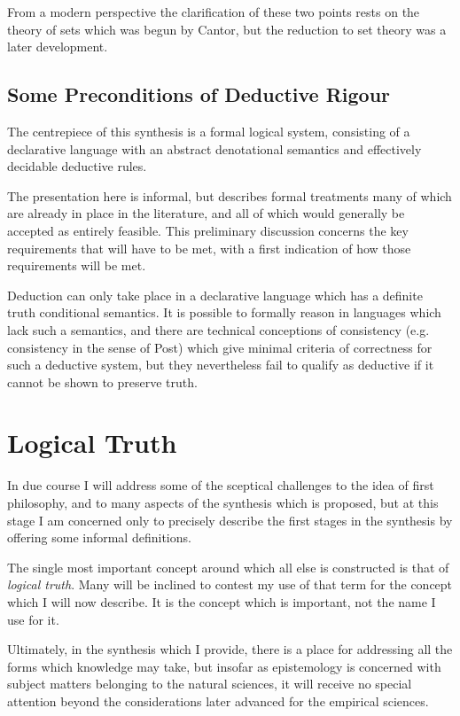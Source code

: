 \documentclass[10pt,titlepage]{book}
\begin{document}
From a modern perspective the clarification of these two points rests on the theory of sets which was begun by Cantor, but the reduction to set theory was a later development.

\section{Some Preconditions of Deductive Rigour}

The centrepiece of this synthesis is a formal logical system, consisting of a declarative language with an abstract denotational semantics and effectively decidable deductive rules.

The presentation here is informal, but describes formal treatments many of which are already in place in the literature, and all of which would generally be accepted as entirely feasible.
This preliminary discussion concerns the key requirements that will have to be met, with a first indication of how those requirements will be met.

Deduction can only take place in a declarative language which has a definite truth conditional semantics.
It is possible to formally reason in languages which lack such a semantics, and there are technical conceptions of consistency (e.g. consistency in the sense of Post) which give minimal criteria of correctness for such a deductive system, but they nevertheless fail to qualify as deductive if it cannot be shown to preserve truth.

\chapter{Logical Truth}

In due course I will address some of the sceptical challenges to the idea of first philosophy, and to many aspects of the synthesis which is proposed, but at this stage I am concerned only to precisely describe the first stages in the synthesis by offering some informal definitions.

The single most important concept around which all else is constructed is that of \emph{logical truth}.
Many will be inclined to contest my use of that term for the concept which I will now describe.
It is the concept which is important, not the name I use for it.

Ultimately, in the synthesis which I provide, there is a place for addressing all the forms which knowledge may take, but insofar as epistemology is concerned with subject matters belonging to the natural sciences, it will receive no special attention beyond the considerations later advanced for the empirical sciences.
\end{document}
